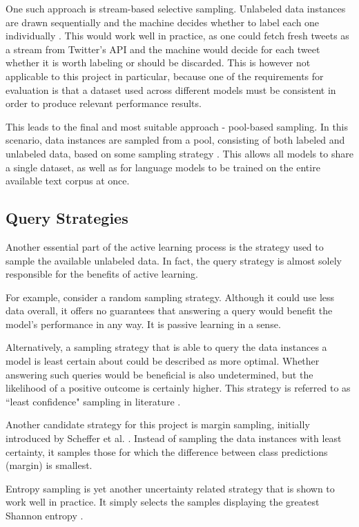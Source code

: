 \documentclass[a4paper,12pt]{article}
\begin{document}
One such approach is stream-based selective sampling. Unlabeled data instances are drawn sequentially and the machine decides whether to label each one individually \cite{Settles2009}. This would work well in practice, as one could fetch fresh tweets as a stream from Twitter's API and the machine would decide for each tweet whether it is worth labeling or should be discarded. This is however not applicable to this project in particular, because one of the requirements for evaluation is that a dataset used across different models must be consistent in order to produce relevant performance results.

This leads to the final and most suitable approach - pool-based sampling. In this scenario, data instances are sampled from a pool, consisting of both labeled and unlabeled data, based on some sampling strategy \cite{Settles2009}. This allows all models to share a single dataset, as well as for language models to be trained on the entire available text corpus at once.
\subsection{Query Strategies}
\label{section:query}
Another essential part of the active learning process is the strategy used to sample the available unlabeled data. In fact, the query strategy is almost solely responsible for the benefits of active learning.

For example, consider a random sampling strategy. Although it could use less data overall, it offers no guarantees that answering a query would benefit the model's performance in any way. It is passive learning in a sense.

Alternatively, a sampling strategy that is able to query the data instances a model is least certain about could be described as more optimal. Whether answering such queries would be beneficial is also undetermined, but the likelihood of a positive outcome is certainly higher. This strategy is referred to as ``least confidence" sampling in literature \cite{10.5555/1613715.1613855}.

Another candidate strategy for this project is margin sampling, initially introduced by Scheffer et al. \cite{10.5555/647967.741626}. Instead of sampling the data instances with least certainty, it samples those for which the difference between class predictions (margin) is smallest.

Entropy sampling is yet another uncertainty related strategy that is shown to work well in practice. It simply selects the samples displaying the greatest Shannon entropy \cite{Schein2007}.
\end{document}
